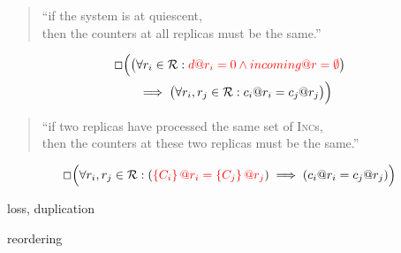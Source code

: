 \begin{frame}{}
  \centerline{\large {}}

  \vspace{0.60cm}
  \begin{quote}
    \begin{center}
      ``if the system is at quiescent, \\
      then the counters at all replicas must be the same.''
    \end{center}
  \end{quote}

  \pause
  \begin{align*}
    \Box \Big(\big(&\forall r_i \in \mathcal{R}: \textcolor{red}{d@r_i = 0 \land incoming@r = \emptyset}\big) \\
      &\implies \big(\forall r_i, r_j \in \mathcal{R}: c_i@r_i = c_j@r_j\big) \Big)
  \end{align*}
\end{frame}

\begin{frame}{}
  \centerline{\large {}}

  \vspace{0.60cm}
  \begin{quote}
    \begin{center}
      ``if two replicas have processed the same set of \textsc{Inc}s, \\
      then the counters at these two replicas must be the same.''
    \end{center}
  \end{quote}

  \pause
  \[
    \Box \Big(\forall r_i, r_j \in \mathcal{R}: (\textcolor{red}{\left\{C_i\right\}@r_i = \left\{C_j\right\}@r_j}) \implies (c_i@r_i = c_j@r_j) \Big)
  \]
\end{frame}

\begin{frame}{}

  \begin{description}[Cannot:]
    \centering
    \item[Cannot:] loss, duplication
    \item[Can:] reordering 
  \end{description}
\end{frame}
